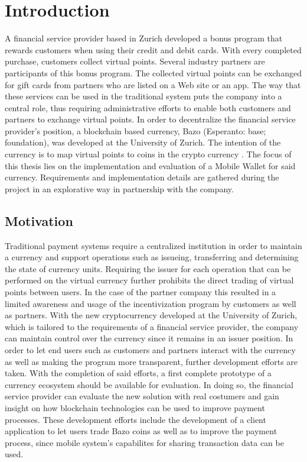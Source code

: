 \chapter{Introduction}

A financial service provider based in Zurich developed a bonus program that rewards customers when using their credit and debit cards. With every completed purchase, customers collect virtual points. Several industry partners are participants of this bonus program. The collected virtual points can be exchanged for gift cards from partners who are listed on a Web site or an app. The way that these services can be used in the traditional system puts the company into a central role, thus requiring administrative efforts to enable both customers and partners to exchange virtual points. In order to decentralize the financial service provider's position, a blockchain based currency, Bazo (Esperanto: base; foundation), was developed at the University of Zurich. The intention of the currency is to map virtual points to coins in the crypto currency \cite{lisg}.
The focus of this thesis lies on the implementation and evaluation of a Mobile Wallet for said currency. Requirements and implementation details are gathered during the project in an explorative way in partnership with the company.
\section{Motivation}
Traditional payment systems require a centralized institution in order to maintain a currency and support operations such as issueing, transferring and determining the state of currency units. Requiring the issuer for each operation that can be performed on the virtual currency further prohibits the direct trading of virtual points between users.
In the case of the partner company this resulted in a limited awareness and usage of the incentivization program by customers as well as partners.
With the new cryptocurrency developed at the University of Zurich, which is tailored to the requirements of a financial service provider, the company can maintain control over the currency since it remains in an issuer position. In order to let end users such as customers and partners interact with the currency as well as making the program more transparent, further development efforts are taken. With the completion of said efforts, a first complete prototype of a currency ecosystem should be available for evaluation. In doing so, the financial service provider can evaluate the new solution with real costumers and gain insight on how blockchain technologies can be used to improve payment processes. These development efforts include the development of a client application to let users trade Bazo coins as well as to improve the payment process, since mobile system's capabilites for sharing transaction data can be used.
